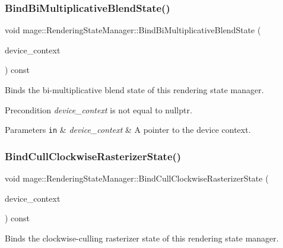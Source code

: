 \subsubsection{\texorpdfstring{Bind\+Bi\+Multiplicative\+Blend\+State()}{BindBiMultiplicativeBlendState()}}
{\footnotesize\ttfamily void mage\+::\+Rendering\+State\+Manager\+::\+Bind\+Bi\+Multiplicative\+Blend\+State (\begin{DoxyParamCaption}\item[{I\+D3\+D11\+Device\+Context4 $\ast$}]{device\+\_\+context }\end{DoxyParamCaption}) const\hspace{0.3cm}{\ttfamily [noexcept]}}

Binds the bi-\/multiplicative blend state of this rendering state manager.

\begin{DoxyPrecond}{Precondition}
{\itshape device\+\_\+context} is not equal to {\ttfamily nullptr}. 
\end{DoxyPrecond}

\begin{DoxyParams}[1]{Parameters}
\mbox{\tt in}  & {\em device\+\_\+context} & A pointer to the device context. \\
\hline
\end{DoxyParams}
\hypertarget{classmage_1_1_rendering_state_manager_a02d762d33aa2aff3ebdbe69ec6f35787}{}\label{classmage_1_1_rendering_state_manager_a02d762d33aa2aff3ebdbe69ec6f35787} 
\subsubsection{\texorpdfstring{Bind\+Cull\+Clockwise\+Rasterizer\+State()}{BindCullClockwiseRasterizerState()}}
{\footnotesize\ttfamily void mage\+::\+Rendering\+State\+Manager\+::\+Bind\+Cull\+Clockwise\+Rasterizer\+State (\begin{DoxyParamCaption}\item[{I\+D3\+D11\+Device\+Context4 $\ast$}]{device\+\_\+context }\end{DoxyParamCaption}) const\hspace{0.3cm}{\ttfamily [noexcept]}}

Binds the clockwise-\/culling rasterizer state of this rendering state manager.

